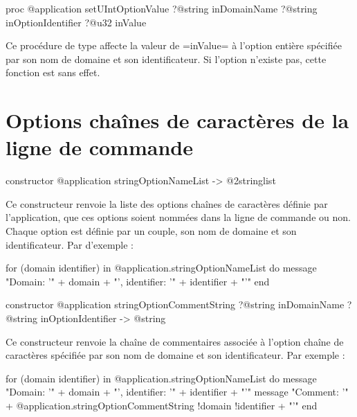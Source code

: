 \begin{galgas4box}
proc @application setUIntOptionValue
    ?@string inDomainName
    ?@string inOptionIdentifier
    ?@u32 inValue
\end{galgas4box}

Ce procédure de type affecte la valeur de \ggsq=inValue= à l'option entière spécifiée par son nom de domaine et son identificateur. Si l'option n'existe pas, cette fonction est sans effet.

















\section{Options chaînes de caractères de la ligne de commande}


\begin{galgas4box}
constructor @application stringOptionNameList -> @2stringlist
\end{galgas4box}

Ce constructeur renvoie la liste des options chaînes de caractères définie par l'application, que ces options soient nommées dans la ligne de commande ou non. Chaque option est définie par un couple, son nom de domaine et son identificateur. Par d'exemple :
\begin{galgas4}
for (domain identifier) in @application.stringOptionNameList do
  message "Domain: '" + domain + "', identifier: '" + identifier + "'\n"
end
\end{galgas4}



\begin{galgas4box}
constructor @application stringOptionCommentString
    ?@string inDomainName
    ?@string inOptionIdentifier -> @string
\end{galgas4box}

Ce constructeur renvoie la chaîne de commentaires associée à l'option chaîne de caractères spécifiée par son nom de domaine et son identificateur. Par exemple :
\begin{galgas4}
for (domain identifier) in @application.stringOptionNameList do
  message "Domain: '" + domain + "', identifier: '" + identifier + "'\n"
  message "Comment: '"
    + @application.stringOptionCommentString {!domain !identifier} + "'\n"
end
\end{galgas4}

